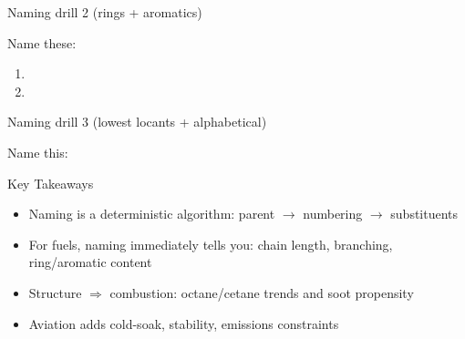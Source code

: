 \documentclass[aspectratio=169]{beamer}
\begin{document}
\begin{frame}{Naming drill 2 (rings + aromatics)}

Name these:
\begin{enumerate}
\item {} 
\item {} 
\end{enumerate}
\end{frame}

\begin{frame}{Naming drill 3 (lowest locants + alphabetical)}

Name this:


\end{frame}

\begin{frame}{Key Takeaways}

\begin{itemize}
\item Naming is a deterministic algorithm: parent \(\rightarrow\) numbering \(\rightarrow\) substituents
\item For fuels, naming immediately tells you: chain length, branching, ring/aromatic content
\item Structure \(\Rightarrow\) combustion: octane/cetane trends and soot propensity
\item Aviation adds cold-soak, stability, emissions constraints
\end{itemize}
\end{frame}
\end{document}
